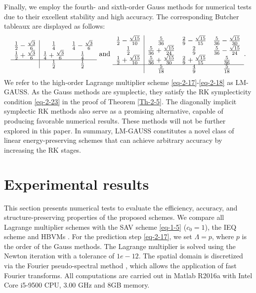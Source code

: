 \documentclass[onefignum,onetabnum]{siamart}
\begin{document}
Finally, we employ the fourth- and sixth-order Gauss methods for numerical tests due to their excellent stability and high accuracy. The corresponding Butcher tableaux \cite{hairer-06-GNI-ODE} are displayed as follows:
\begin{equation*}
	\begin{array}{c|cc}
		\frac{1}{2}-\frac{\sqrt{3}}{6} & \frac{1}{4} & \frac{1}{4}-\frac{\sqrt{3}}{6}\\
		\frac{1}{2}+\frac{\sqrt{3}}{6} & \frac{1}{4}+\frac{\sqrt{3}}{6} & \frac{1}{4}\\
		\hline
		& \frac{1}{2} & \frac{1}{2}
	\end{array}~\mbox{and}~
	\begin{array}{c|cccc}
		\frac{1}{2}-\frac{\sqrt{15}}{10} & \frac{5}{36} & \frac{2}{9}-\frac{\sqrt{15}}{15} & \frac{5}{36}-\frac{\sqrt{15}}{30}\\
		\frac{1}{2} & \frac{5}{36}+\frac{\sqrt{15}}{24} & \frac{2}{9}  &\frac{5}{36}-\frac{\sqrt{15}}{24} \\
		\frac{1}{2}+\frac{\sqrt{15}}{10} & \frac{5}{36}+\frac{\sqrt{15}}{30} & \frac{2}{9}+\frac{\sqrt{15}}{15} & \frac{5}{36}\\
		\hline
		& \frac{5}{18} & \frac{4}{9} & \frac{5}{18}
	\end{array}.
\end{equation*}
We refer to the high-order Lagrange multiplier scheme \eqref{eq-2-17}-\eqref{eq-2-18} as LM-GAUSS. As the Gauss methods are symplectic, they satisfy the RK symplecticity condition \eqref{eq-2-23} in the proof of Theorem \ref{Th-2-5}. The diagonally implicit symplectic RK methods also serve as a promising alternative, capable of producing favorable numerical results. These methods will not be further explored in this paper. In summary, LM-GAUSS constitutes a novel class of linear energy-preserving schemes that can achieve arbitrary accuracy by increasing the RK stages.


\section{Experimental results}\label{sec:experiments}
This section presents numerical tests to evaluate the efficiency, accuracy, and structure-preserving properties of the proposed schemes. We compare all Lagrange multiplier schemes with the SAV scheme \eqref{eq-1-5} ($c_0=1$), the IEQ scheme \cite{cai-20-linear-MS-JCP,jiang-19-SG-IEQ-JSC} and HBVMs \cite{luigi-10-HBVM-JNAIAM}. For the prediction step \eqref{eq-2-17}, we set $\Lambda=p$, where $p$ is the order of the Gauss methods. The Lagrange multiplier is solved using the Newton iteration with a tolerance of $1e-12$. The spatial domain is discretized via the Fourier pseudo-spectral method \cite{shen-11-spectral}, which allows the application of fast Fourier transforms. All computations are carried out in Matlab R2016a with Intel Core i5-9500 CPU, 3.00 GHz and 8GB memory. 
\end{document}
